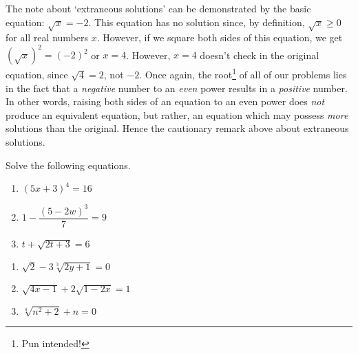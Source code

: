 \documentclass{ximera}
\begin{document}
{{{\begin{itemize}
\end{itemize}


\medskip

The note about `extraneous solutions' can be demonstrated by the basic equation: $\sqrt{x} = -2$.  This equation has no solution since, by definition, $\sqrt{x} \geq 0$ for all real numbers $x$.  However, if we square both sides of this equation, we get $(\sqrt{x})^2 = (-2)^2$ or $x = 4$.  However, $x = 4$ doesn't check in the original equation, since $\sqrt{4} = 2$, not $-2$.  Once again, the root\footnote{Pun intended!} of all of our problems lies in the fact that a \textit{negative} number to an \textit{even} power results in a \textit{positive} number. In other words, raising both sides of an equation to an even power does \textit{not} produce an equivalent equation, but rather, an equation which may possess \textit{more} solutions than the original.  Hence the cautionary remark above about extraneous solutions.

\begin{example}\label{radicaleqnreview}  Solve the following equations.


\begin{multicols}{3}
\begin{enumerate}


\item  $(5x +3)^{4} = 16$

\item  $1 - \dfrac{(5-2w)^3}{7} = 9$

\item  $t + \sqrt{2t+3} = 6$


\setcounter{HW}{\value{enumi}}
\end{enumerate}
\end{multicols}

\begin{multicols}{3}
\begin{enumerate}

\setcounter{enumi}{\value{HW}}

\item $\sqrt{2} - 3\sqrt[3]{2y+1} = 0$ 

\item  $\sqrt{4x-1}  + 2\sqrt{1 - 2x} = 1$

\item  $\sqrt[4]{n^2 + 2} + n = 0$


\end{enumerate}
\end{multicols}
\end{example}}}}
\end{document}
